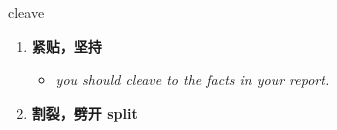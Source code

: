 
\begin{frame}
{\huge cleave}
\begin{center}
\begin{enumerate}\Large
  \item \textbf{紧贴，坚持}
  \begin{itemize}
    \item \em{\Large{you should cleave to the facts in your report.}}
  \end{itemize}
  \item \textbf{割裂，劈开 split}
\end{enumerate}
\end{center}
\end{frame}
